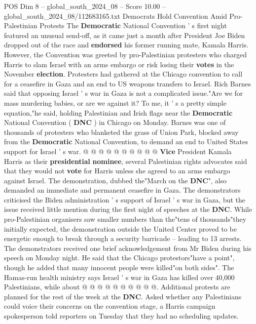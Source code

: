 \begin{textsample}{POS Dim 8 – global\_south\_2024\_08 – Score 10.00 – global\_south\_2024\_08/112683165.txt}  \label{ex:f8_pos_177}
Democrats Hold Convention Amid Pro-Palestinian Protests The \textbf{Democratic} National Convention ' s first night featured an unusual send-off, as it came just a month after President Joe Biden dropped out of the race and \textbf{endorsed} his former running mate, Kamala Harris.
However, the Convention was greeted by pro-Palestinian protesters who charged Harris to slam Israel with an arms embargo or risk losing their \textbf{votes} in the November \textbf{election}.
Protesters had gathered at the Chicago convention to call for a ceasefire in Gaza and an end to US weapons transfers to Israel.
Rich Barnes said that opposing Israel ' s war in Gaza is not a complicated issue."Are we for mass murdering babies, or are we against it?
To me, it ' s a pretty simple equation,"he said, holding Palestinian and Irish flags near the \textbf{Democratic} National Convention ( \textbf{DNC} ) in Chicago on Monday.
Barnes was one of thousands of protesters who blanketed the grass of Union Park, blocked away from the \textbf{Democratic} National Convention, to demand an end to United States support for Israel ' s war. @ @ @ @ @ @ @ @ @ @ \textbf{Vice} President Kamala Harris as their \textbf{presidential} \textbf{nominee}, several Palestinian rights advocates said that they would not \textbf{vote} for Harris unless she agreed to an arms embargo against Israel.
The demonstration, dubbed the"March on the \textbf{DNC}", also demanded an immediate and permanent ceasefire in Gaza.
The demonstrators criticised the Biden administration ' s support of Israel ' s war in Gaza, but the issue received little mention during the first night of speeches at the \textbf{DNC}.
While pro-Palestinian organisers saw smaller numbers than the"tens of thousands"they initially expected, the demonstration outside the United Center proved to be energetic enough to break through a security barricade -- leading to 13 arrests.
The demonstrators received one brief acknowledgement from Mr Biden during his speech on Monday night.
He said that the Chicago protestors"have a point", though he added that many innocent people were killed"on both sides".
The Hamas-run health ministry says Israel ' s war in Gaza has killed over 40,000 Palestinians, while about @ @ @ @ @ @ @ @ @ @.
Additional protests are planned for the rest of the week at the \textbf{DNC}.
Asked whether any Palestinians could voice their concerns on the convention stage, a Harris campaign spokesperson told reporters on Tuesday that they had no scheduling updates.

\end{textsample}
